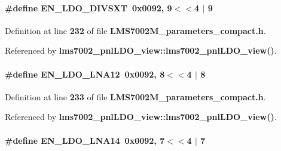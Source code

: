 \paragraph[{E\+N\+\_\+\+L\+D\+O\+\_\+\+D\+I\+V\+S\+XT}]{\setlength{\rightskip}{0pt plus 5cm}\#define E\+N\+\_\+\+L\+D\+O\+\_\+\+D\+I\+V\+S\+XT~0x0092, 9$<$$<$4 $\vert$  9}\label{LMS7002M__parameters__compact_8h_a9ebf912c513945c96ff518c062e52abb}


Definition at line {\bf 232} of file {\bf L\+M\+S7002\+M\+\_\+parameters\+\_\+compact.\+h}.



Referenced by {\bf lms7002\+\_\+pnl\+L\+D\+O\+\_\+view\+::lms7002\+\_\+pnl\+L\+D\+O\+\_\+view()}.

\paragraph[{E\+N\+\_\+\+L\+D\+O\+\_\+\+L\+N\+A12}]{\setlength{\rightskip}{0pt plus 5cm}\#define E\+N\+\_\+\+L\+D\+O\+\_\+\+L\+N\+A12~0x0092, 8$<$$<$4 $\vert$  8}\label{LMS7002M__parameters__compact_8h_a0b2106a8f9d88016af5813bc458856ca}


Definition at line {\bf 233} of file {\bf L\+M\+S7002\+M\+\_\+parameters\+\_\+compact.\+h}.



Referenced by {\bf lms7002\+\_\+pnl\+L\+D\+O\+\_\+view\+::lms7002\+\_\+pnl\+L\+D\+O\+\_\+view()}.

\paragraph[{E\+N\+\_\+\+L\+D\+O\+\_\+\+L\+N\+A14}]{\setlength{\rightskip}{0pt plus 5cm}\#define E\+N\+\_\+\+L\+D\+O\+\_\+\+L\+N\+A14~0x0092, 7$<$$<$4 $\vert$  7}\label{LMS7002M__parameters__compact_8h_a488a011b32c74ba6f834d46fca5d0d80}



